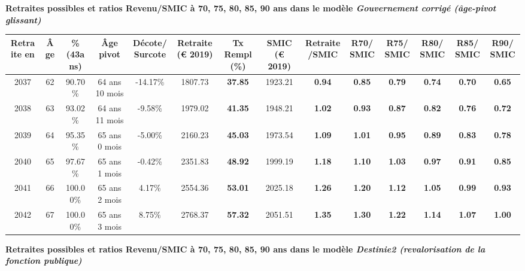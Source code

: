  \vspace{0.1cm} 
{\bf \noindent Retraites possibles et ratios Revenu/SMIC à 70, 75, 80, 85, 90 ans dans le modèle \emph{Gouvernement corrigé (âge-pivot glissant)}}  
 
\begin{adjustbox}{max width=\textwidth} 
\begin{tabular}[htb]{|c|c||c|c|c||c|c||c|c||c|c|c|c|c|} 
\hline 
 Retraite en &  Âge &  \%(43ans) &  Âge pivot &  Décote/Surcote &  Retraite (\euro{} 2019) &  Tx Rempl(\%) &  SMIC (\euro{} 2019) &  Retraite/SMIC &  R70/SMIC &  R75/SMIC &  R80/SMIC &  R85/SMIC &  R90/SMIC \\ 
\hline \hline 
 2037 &  62 &  90.70\% &  64 ans 10 mois &  -14.17\% &  1807.73 &  {\bf 37.85} &  1923.21 &  {\bf {\color{red} 0.94}} &  {\bf {\color{red} 0.85}} &  {\bf {\color{red} 0.79}} &  {\bf {\color{red} 0.74}} &  {\bf {\color{red} 0.70}} &  {\bf {\color{red} 0.65}} \\ 
\hline 
 2038 &  63 &  93.02\% &  64 ans 11 mois &  -9.58\% &  1979.02 &  {\bf 41.35} &  1948.21 &  {\bf 1.02} &  {\bf {\color{red} 0.93}} &  {\bf {\color{red} 0.87}} &  {\bf {\color{red} 0.82}} &  {\bf {\color{red} 0.76}} &  {\bf {\color{red} 0.72}} \\ 
\hline 
 2039 &  64 &  95.35\% &  65 ans 0 mois &  -5.00\% &  2160.23 &  {\bf 45.03} &  1973.54 &  {\bf 1.09} &  {\bf 1.01} &  {\bf {\color{red} 0.95}} &  {\bf {\color{red} 0.89}} &  {\bf {\color{red} 0.83}} &  {\bf {\color{red} 0.78}} \\ 
\hline 
 2040 &  65 &  97.67\% &  65 ans 1 mois &  -0.42\% &  2351.83 &  {\bf 48.92} &  1999.19 &  {\bf 1.18} &  {\bf 1.10} &  {\bf 1.03} &  {\bf {\color{red} 0.97}} &  {\bf {\color{red} 0.91}} &  {\bf {\color{red} 0.85}} \\ 
\hline 
 2041 &  66 &  100.00\% &  65 ans 2 mois &  4.17\% &  2554.36 &  {\bf 53.01} &  2025.18 &  {\bf 1.26} &  {\bf 1.20} &  {\bf 1.12} &  {\bf 1.05} &  {\bf {\color{red} 0.99}} &  {\bf {\color{red} 0.93}} \\ 
\hline 
 2042 &  67 &  100.00\% &  65 ans 3 mois &  8.75\% &  2768.37 &  {\bf 57.32} &  2051.51 &  {\bf 1.35} &  {\bf 1.30} &  {\bf 1.22} &  {\bf 1.14} &  {\bf 1.07} &  {\bf 1.00} \\ 
\hline 
\hline 
\end{tabular} 
\end{adjustbox} 
 
 \vspace{0.1cm} 
{\bf \noindent Retraites possibles et ratios Revenu/SMIC à 70, 75, 80, 85, 90 ans dans le modèle \emph{Destinie2 (revalorisation de la fonction publique)}}  
 
